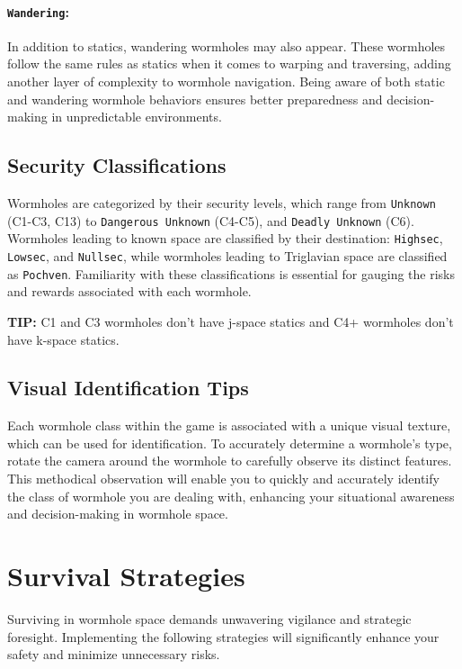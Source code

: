 \documentclass[a4paper,12pt]{article}
\begin{document}
\paragraph{\texttt{Wandering}:} In addition to statics, wandering wormholes may also appear. These wormholes follow the same rules as statics when it comes to warping and traversing, adding another layer of complexity to wormhole navigation. Being aware of both static and wandering wormhole behaviors ensures better preparedness and decision-making in unpredictable environments.

\subsection{Security Classifications}

Wormholes are categorized by their security levels, which range from \texttt{Unknown} (C1-C3, C13) to \texttt{Dangerous Unknown} (C4-C5), and \texttt{Deadly Unknown} (C6). Wormholes leading to known space are classified by their destination: \texttt{Highsec}, \texttt{Lowsec}, and \texttt{Nullsec}, while wormholes leading to Triglavian space are classified as \texttt{Pochven}. Familiarity with these classifications is essential for gauging the risks and rewards associated with each wormhole.

\textsf{\textbf{TIP:}} \textsf{C1 and C3 wormholes don't have j-space statics and C4+ wormholes don't have k-space statics.}

\subsection{Visual Identification Tips}

Each wormhole class within the game is associated with a unique visual texture, which can be used for identification. To accurately determine a wormhole’s type, rotate the camera around the wormhole to carefully observe its distinct features. This methodical observation will enable you to quickly and accurately identify the class of wormhole you are dealing with, enhancing your situational awareness and decision-making in wormhole space.

\section{Survival Strategies}

Surviving in wormhole space demands unwavering vigilance and strategic foresight. Implementing the following strategies will significantly enhance your safety and minimize unnecessary risks.
\end{document}
